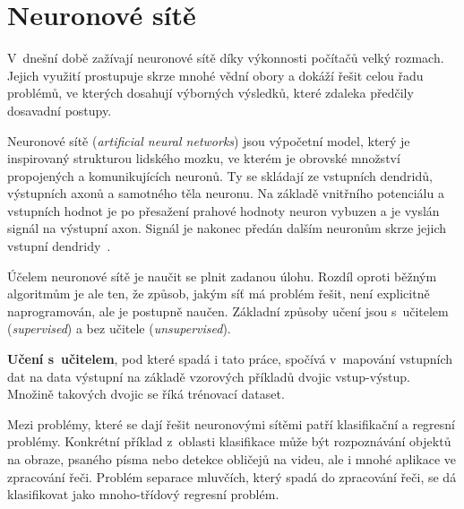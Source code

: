 



\chapter{Neuronové sítě}
\label{neuronovky}
V~dnešní době zažívají neuronové sítě díky výkonnosti počítačů velký rozmach. Jejich využití prostupuje skrze mnohé vědní obory a dokáží řešit celou řadu problémů, ve kterých dosahují výborných výsledků, které zdaleka předčily dosavadní postupy. 

Neuronové sítě (\textit{artificial neural networks}) jsou výpočetní model, který je inspirovaný strukturou lidského mozku, ve kterém je obrovské množství propojených a komunikujících neuronů. Ty se skládají ze vstupních dendridů, výstupních axonů a samotného těla neuronu. Na základě vnitřního potenciálu a vstupních hodnot je po přesažení prahové hodnoty neuron vybuzen a je vyslán signál na výstupní axon. Signál je nakonec předán dalším neuronům skrze jejich vstupní dendridy~\cite{mitdeeplearning_small}.

Účelem neuronové sítě je naučit se plnit zadanou úlohu. Rozdíl oproti běžným algoritmům je ale ten, že způsob, jakým síť má problém řešit, není explicitně naprogramován, ale je postupně naučen. Základní způsoby učení jsou s~učitelem (\textit{supervised}) a bez učitele (\textit{unsupervised}). 

\textbf{Učení s~učitelem}, pod které spadá i tato práce, spočívá v~mapování vstupních dat na data výstupní na základě vzorových příkladů dvojic vstup-výstup. Množině takových dvojic se říká trénovací dataset.

Mezi problémy, které se dají řešit neuronovými sítěmi patří klasifikační a regresní problémy. Konkrétní příklad z~oblasti klasifikace může být rozpoznávání objektů na obraze, psaného písma nebo detekce obličejů na videu, ale i mnohé aplikace ve zpracování řeči. Problém separace mluvčích, který spadá do zpracování řeči, se dá klasifikovat jako mnoho-třídový regresní problém.

